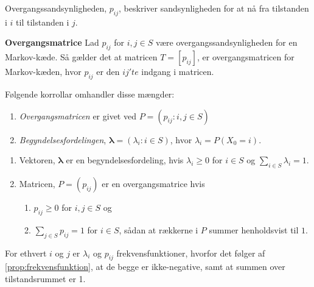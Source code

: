 Overgangssandsynligheden, $p_{ij}$, beskriver sandsynligheden for at nå fra tilstanden i $i$ til tilstanden i $j$.

\begin{minipage}\textwidth
\begin{defn}\textbf{Overgangsmatrice} %
\newline
Lad $p_{ij}$ for $i,j \in S$ være overgangssandsynligheden for en Markov-kæde. Så gælder det at matricen $T = [p_{ij}]$, er overgangsmatricen for Markov-kæden, hvor $p_{ij}$ er den $ij'te$ indgang i matricen.
\end{defn}
\end{minipage}

Følgende korrollar omhandler disse mængder:
\begin{enumerate}[label=(\alph*)]
    \item \textit{Overgangsmatricen} er givet ved $P=(p_{ij}:i,j\in S)$
    \item \textit{Begyndelsesfordelingen}, $\bm{\lambda}=(\lambda_i:i\in S)$, hvor $\lambda_i=P(X_0=i)$.
\end{enumerate}

\begin{minipage}\textwidth
\begin{kor} \textbf{} %
\newline
\begin{enumerate}[label=(\alph*)]
    \item Vektoren, $\bm{\lambda}$ er en begyndelsesfordeling, hvis $\lambda_i\geq 0$ for $i\in S$ og $\sum_{i\in S}\lambda_i=1$.
    \item Matricen, $P=(p_{ij})$ er en overgangsmatrice hvis 
    \begin{enumerate}[label=(\roman*)]
    \item $p_{ij}\geq0$ for $i,j\in S$ og
    \item $\sum_{j\in S}p_{ij}=1$ for $i\in S$, sådan at rækkerne i $P$ summer henholdsvist til $1$. 
    \end{enumerate}
\end{enumerate}
\end{kor}
\end{minipage}
\begin{bev} \textbf{} %
\newline
For ethvert $i$ og $j$ er $\lambda_i$ og $p_{ij}$ frekvensfunktioner, hvorfor det følger af \autoref{prop:frekvensfunktion}, at 
de begge er ikke-negative, samt at summen over tilstandsrummet er 1.
\end{bev}

